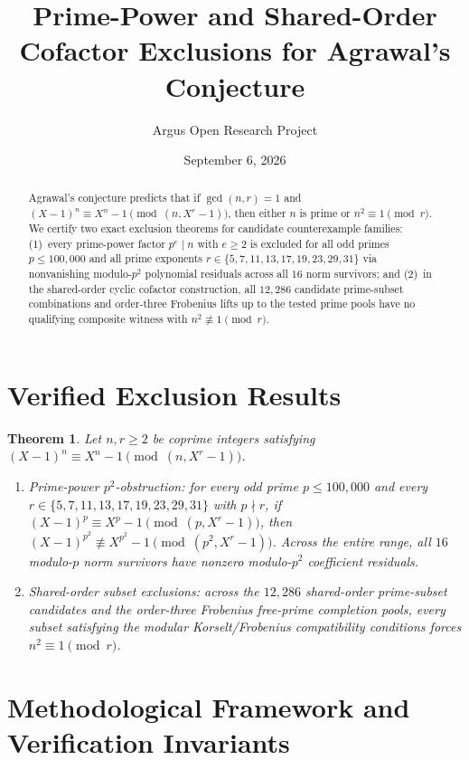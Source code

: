 \documentclass[10pt,reqno]{amsart}
\title[Prime-Power and Shared-Order Exclusions for Agrawal's Conjecture]
{Prime-Power and Shared-Order Cofactor Exclusions for Agrawal's Conjecture}
\author{Argus Open Research Project}
\date{September 6, 2026}
\newtheorem{theorem}{Theorem}[section]
\theoremstyle{definition}
\begin{document}
\begin{abstract}
Agrawal's conjecture predicts that if $\gcd(n,r)=1$ and $(X-1)^n\equiv X^n-1\pmod{(n,X^r-1)}$, then either $n$ is prime or $n^2\equiv 1\pmod r$. We certify two exact exclusion theorems for candidate counterexample families: (1)~every prime-power factor $p^e\mid n$ with $e\ge 2$ is excluded for all odd primes $p\le 100{,}000$ and all prime exponents $r\in\{5,7,11,13,17,19,23,29,31\}$ via nonvanishing modulo-$p^2$ polynomial residuals across all $16$ norm survivors; and (2)~in the shared-order cyclic cofactor construction, all $12{,}286$ candidate prime-subset combinations and order-three Frobenius lifts up to the tested prime pools have no qualifying composite witness with $n^2\not\equiv 1\pmod r$.
\end{abstract}
\maketitle
\section{Verified Exclusion Results}
\begin{theorem}
Let $n,r\ge 2$ be coprime integers satisfying $(X-1)^n\equiv X^n-1\pmod{(n,X^r-1)}$.
\begin{enumerate}[label=\textup{(\arabic*)}]
  \item \emph{Prime-power $p^2$-obstruction:} for every odd prime $p\le 100{,}000$ and every $r\in\{5,7,11,13,17,19,23,29,31\}$ with $p\nmid r$, if $(X-1)^p\equiv X^p-1\pmod{(p,X^r-1)}$, then $(X-1)^{p^2}\not\equiv X^{p^2}-1\pmod{(p^2,X^r-1)}$. Across the entire range, all $16$ modulo-$p$ norm survivors have nonzero modulo-$p^2$ coefficient residuals.
  \item \emph{Shared-order subset exclusions:} across the $12{,}286$ shared-order prime-subset candidates and the order-three Frobenius free-prime completion pools, every subset satisfying the modular Korselt/Frobenius compatibility conditions forces $n^2\equiv 1\pmod r$.
\end{enumerate}
\end{theorem}

\section{Methodological Framework and Verification Invariants}
\end{document}
